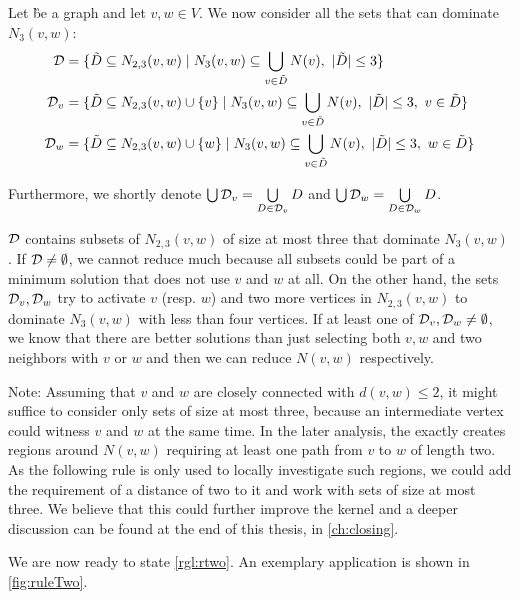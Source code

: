\begin{definition}\label{def:dvv}
Let \G be a graph and let $v,w \in V$. We now consider all the sets that can dominate $N_3(v,w)$:
\begin{align}
    \mathcal{D} & = \{ \tilde D \subseteq N_{2,3}(v,w)            \mid N_3(v,w) \subseteq \bigcup_{v \in \tilde D} N(v),\ |\tilde D| \leq 3                  \} \\
    \mathcal{D}_{v}  & = \{ \tilde D \subseteq N_{2,3}(v,w) \cup \{v\} \mid N_3(v,w) \subseteq \bigcup_{v \in \tilde D} N(v),\ |\tilde D| \leq 3,\ v \in \tilde D \} \\
    \mathcal{D}_{w}  & = \{ \tilde D \subseteq N_{2,3}(v,w) \cup \{w\} \mid N_3(v,w) \subseteq \bigcup_{v \in \tilde D} N(v),\ |\tilde D| \leq 3,\ w \in \tilde D \}
\end{align}

Furthermore, we shortly denote $\bigcup \mathcal{D}_{v} = \bigcup\limits_{D \in \mathcal{D}_{v}}D $ and $\bigcup \mathcal{D}_{w} = \bigcup\limits_{D \in \mathcal{D}_{w}}D$.
\end{definition}

$\mathcal{D}$ contains subsets of $N_{2,3}(v,w)$ of size at most three that dominate $N_3(v,w)$.
If $\mathcal{D} \neq \emptyset$, we cannot reduce much because all subsets could be part of a minimum solution that does not use $v$ and $w$ at all.
On the other hand, the sets $\mathcal{D}_{v}, \mathcal{D}_{w}$ try to activate $v$ (resp. $w$) and two more vertices in $N_{2,3}(v, w)$ to dominate $N_3(v,w)$ with less than four vertices.
If at least one of $\mathcal{D}_{v},\mathcal{D}_{w} \neq \emptyset$, we know that there are better solutions than just selecting both $v,w$ and two neighbors with $v$ or $w$ and then we can reduce $N(v,w)$ respectively.

Note: Assuming that $v$ and $w$ are closely connected with $d(v,w) \leq 2$, it might suffice to consider only sets of size at most three, because an intermediate vertex could witness $v$ and $w$ at the same time. 
In the later analysis, the \dreg exactly creates regions around $N(v,w)$ requiring at least one path from $v$ to $w$ of length two. 
As the following rule is only used to locally investigate such regions, we could add the requirement of a distance of two to it and work with sets of size at most three. 
We believe that this could further improve the kernel and a deeper discussion can be found at the end of this thesis, in  \cref{ch:closing}.

We are now ready to state \cref{rgl:rtwo}. An exemplary application is shown in \cref{fig:ruleTwo}.

